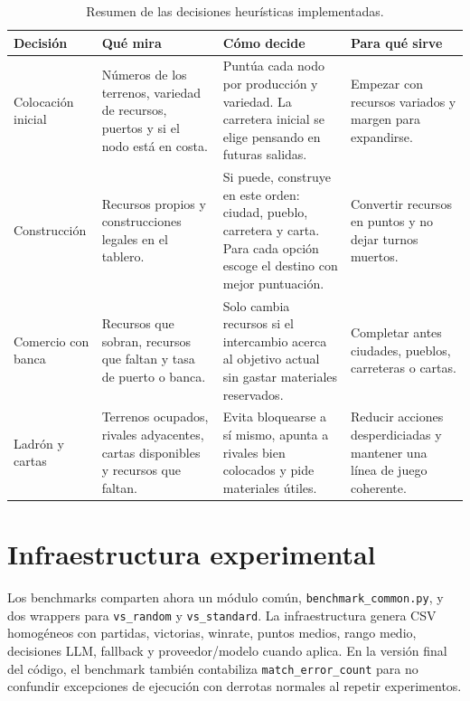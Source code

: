 ﻿\documentclass[10pt,a4paper]{article}
\renewcommand{\arraystretch}{1.08}
\begin{document}
\begin{table}[H]
\centering
\small
\renewcommand{\arraystretch}{1.28}
\setlength{\tabcolsep}{5pt}
\begin{tabular}{L{2.6cm}L{4.2cm}L{5.0cm}L{3.8cm}}
\toprule
Decisión & Qué mira & Cómo decide & Para qué sirve \\
\midrule
Colocación inicial & Números de los terrenos, variedad de recursos, puertos y si el nodo está en costa. & Puntúa cada nodo por producción y variedad. La carretera inicial se elige pensando en futuras salidas. & Empezar con recursos variados y margen para expandirse. \\
\addlinespace[0.35em]
Construcción & Recursos propios y construcciones legales en el tablero. & Si puede, construye en este orden: ciudad, pueblo, carretera y carta. Para cada opción escoge el destino con mejor puntuación. & Convertir recursos en puntos y no dejar turnos muertos. \\
\addlinespace[0.35em]
Comercio con banca & Recursos que sobran, recursos que faltan y tasa de puerto o banca. & Solo cambia recursos si el intercambio acerca al objetivo actual sin gastar materiales reservados. & Completar antes ciudades, pueblos, carreteras o cartas. \\
\addlinespace[0.35em]
Ladrón y cartas & Terrenos ocupados, rivales adyacentes, cartas disponibles y recursos que faltan. & Evita bloquearse a sí mismo, apunta a rivales bien colocados y pide materiales útiles. & Reducir acciones desperdiciadas y mantener una línea de juego coherente. \\
\bottomrule
\end{tabular}
\caption{Resumen de las decisiones heurísticas implementadas.}
\label{tab:heuristicas}
\end{table}
\clearpage

\section{Infraestructura experimental}
Los benchmarks comparten ahora un módulo común, \texttt{benchmark\_common.py}, y dos wrappers para \texttt{vs\_random} y \texttt{vs\_standard}. La infraestructura genera CSV homogéneos con partidas, victorias, winrate, puntos medios, rango medio, decisiones LLM, fallback y proveedor/modelo cuando aplica. En la versión final del código, el benchmark también contabiliza \texttt{match\_error\_count} para no confundir excepciones de ejecución con derrotas normales al repetir experimentos.
\end{document}
